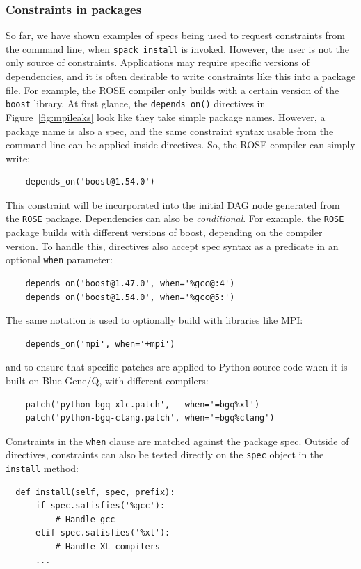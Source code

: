 \subsubsection{Constraints in packages}\label{sec:constraints}

So far, we have shown examples of specs being used to request constraints from the
command line, when {\tt spack install} is invoked.  However, the user is not the only
source of constraints.  Applications may require specific versions of dependencies,
and it is often desirable to write constraints like this into a package file.  For
example, the ROSE compiler only builds with a certain version of the {\tt boost} library.
At first glance, the {\tt depends\_on()} directives in Figure~\ref{fig:mpileaks} look
like they take simple package names.  However, a package name is also a spec, and
the same constraint syntax usable from the command line can be applied inside directives.
So, the ROSE compiler can simply write:
%
\begin{verbatim}
    depends_on('boost@1.54.0')
\end{verbatim}
%
This constraint will be incorporated into the initial DAG node generated from
the {\tt ROSE} package.  Dependencies can also be {\it conditional}.  For example,
the {\tt ROSE} package builds with different versions of boost, depending on the
compiler version. To handle this, directives also accept spec syntax as a
predicate in an optional {\tt when} parameter:
%
\begin{verbatim}
    depends_on('boost@1.47.0', when='%gcc@:4')
    depends_on('boost@1.54.0', when='%gcc@5:')
\end{verbatim}
%
The same notation is used to optionally build with libraries like MPI:
%
\begin{verbatim}
    depends_on('mpi', when='+mpi')
\end{verbatim}
%
and to ensure that specific patches are applied to Python source code
when it is built on Blue Gene/Q, with different compilers:
%
\begin{verbatim}
    patch('python-bgq-xlc.patch',   when='=bgq%xl')
    patch('python-bgq-clang.patch', when='=bgq%clang')
\end{verbatim}
%
Constraints in the {\tt when} clause are matched against the package spec.
Outside of directives, constraints can also be tested directly on the {\tt spec}
object in the {\tt install} method:
%
\begin{verbatim}
  def install(self, spec, prefix):
      if spec.satisfies('%gcc'):
          # Handle gcc
      elif spec.satisfies('%xl'):
          # Handle XL compilers
      ...
\end{verbatim}
%

